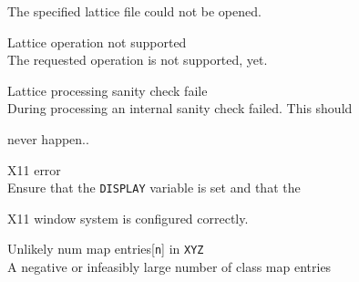 \begin{itemize}
\begin{itemize}
        The specified lattice file could not be opened.





    Lattice operation not supported\\


        The requested operation is not supported, yet.


    Lattice processing sanity check faile\\


        During processing an internal sanity check failed. This should


        never happen..





\end{itemize}













\begin{itemize}


    X11 error\\


        Ensure that the \texttt{DISPLAY} variable is set and that the


        X11 window system is configured correctly.





\end{itemize}




















\begin{itemize}


  Unlikely num map entries[\texttt{n}] in \texttt{XYZ}\\


        A negative or infeasibly large number of class map entries



\end{itemize}
\end{itemize}
